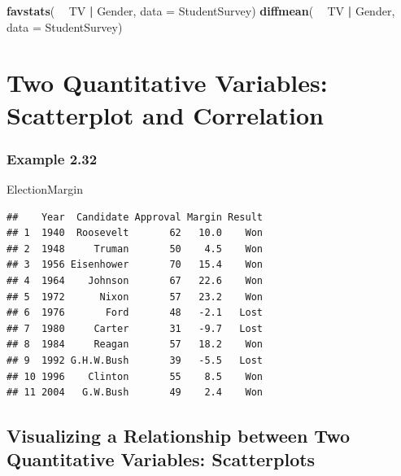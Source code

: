 \documentclass[]{book}
\newenvironment{Shaded}{\begin{snugshade}}{\end{snugshade}}
\newcommand{\DataTypeTok}[1]{\textcolor[rgb]{0.13,0.29,0.53}{#1}}
\newcommand{\KeywordTok}[1]{\textcolor[rgb]{0.13,0.29,0.53}{\textbf{#1}}}
\newcommand{\NormalTok}[1]{#1}
\newcommand{\OperatorTok}[1]{\textcolor[rgb]{0.81,0.36,0.00}{\textbf{#1}}}
\newcommand{\StringTok}[1]{\textcolor[rgb]{0.31,0.60,0.02}{#1}}
\begin{document}
\begin{Shaded}
\begin{Highlighting}[]
\KeywordTok{favstats}\NormalTok{( }\OperatorTok{~}\StringTok{ }\NormalTok{TV }\OperatorTok{|}\StringTok{ }\NormalTok{Gender, }\DataTypeTok{data =}\NormalTok{ StudentSurvey)}
\KeywordTok{diffmean}\NormalTok{( }\OperatorTok{~}\StringTok{ }\NormalTok{TV }\OperatorTok{|}\StringTok{ }\NormalTok{Gender, }\DataTypeTok{data =}\NormalTok{ StudentSurvey)}
\end{Highlighting}
\end{Shaded}

\hypertarget{two-quantitative-variables-scatterplot-and-correlation}{%
\section{Two Quantitative Variables: Scatterplot and Correlation}\label{two-quantitative-variables-scatterplot-and-correlation}}

\hypertarget{example-2.32}{%
\subsubsection{Example 2.32}\label{example-2.32}}

\begin{Shaded}
\begin{Highlighting}[]
\NormalTok{ElectionMargin}
\end{Highlighting}
\end{Shaded}

\begin{verbatim}
##    Year  Candidate Approval Margin Result
## 1  1940  Roosevelt       62   10.0    Won
## 2  1948     Truman       50    4.5    Won
## 3  1956 Eisenhower       70   15.4    Won
## 4  1964    Johnson       67   22.6    Won
## 5  1972      Nixon       57   23.2    Won
## 6  1976       Ford       48   -2.1   Lost
## 7  1980     Carter       31   -9.7   Lost
## 8  1984     Reagan       57   18.2    Won
## 9  1992 G.H.W.Bush       39   -5.5   Lost
## 10 1996    Clinton       55    8.5    Won
## 11 2004   G.W.Bush       49    2.4    Won
\end{verbatim}

\hypertarget{visualizing-a-relationship-between-two-quantitative-variables-scatterplots}{%
\subsection{Visualizing a Relationship between Two Quantitative Variables: Scatterplots}\label{visualizing-a-relationship-between-two-quantitative-variables-scatterplots}}
\end{document}
